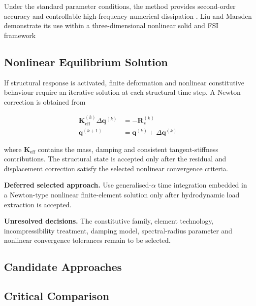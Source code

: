 Under the standard parameter conditions, the method provides second-order accuracy and controllable high-frequency numerical dissipation \autocite{chung1993}. Liu and Marsden demonstrate its use within a three-dimensional nonlinear solid and FSI framework \autocite{liu2018}

\subsection{Nonlinear Equilibrium Solution}
\label{subsec:res_str_sim_nonlinear_equilibrium_solution}

If structural response is activated, finite deformation and nonlinear
constitutive behaviour require an iterative solution at each structural
time step. A Newton correction is obtained from

\begin{align}
\bm{K}_{\mathrm{eff}}^{(k)}
\Delta\bm{q}^{(k)}
&=
-\bm{R}_{s}^{(k)}
\label{eq:res_str_sim_newton_correction}
\\
\bm{q}^{(k+1)}
&=
\bm{q}^{(k)}
+
\Delta\bm{q}^{(k)}
\label{eq:res_str_sim_newton_update}
\end{align}

where \(\bm{K}_{\mathrm{eff}}\) contains the mass, damping and consistent tangent-stiffness contributions. The structural state is accepted only after the residual and displacement correction satisfy the selected nonlinear convergence criteria.

\textbf{Deferred selected approach.} Use generalised-\(\alpha\) time
integration embedded in a Newton-type nonlinear finite-element solution
only after hydrodynamic load extraction is accepted.

\textbf{Unresolved decisions.} The constitutive family, element technology, incompressibility treatment, damping model, spectral-radius parameter and nonlinear convergence tolerances remain to be selected.

\subsection{Candidate Approaches}
\label{sec:res-str-sim-candidate-approaches}


\subsection{Critical Comparison}
\label{sec:res-str-sim-critical-comparison}

